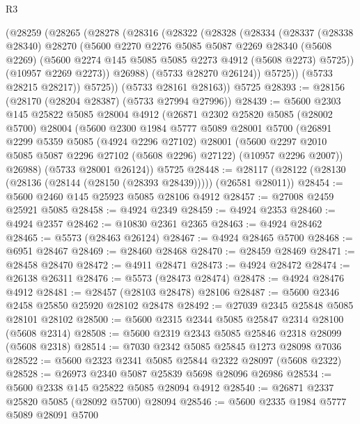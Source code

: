 \begin{lexlean}{R3}
\begin{coremodule}
      (@28259
        (@28265
          (@28278
            (@28316
              (@28322
                (@28328
                  (@28334
                    (@28337
                      (@28338 @28340)
                      @28270
                      (@5600
                        @2270
                        @2276
                        @5085
                        @5087
                        @2269
                        @28340
                        (@5608 @2269)
                        (@5600 @2274 @145 @5085 @5085 @2273 @4912 (@5608 @2273) @5725))
                      (@10957 @2269 @2273))
                    @26988)
                  (@5733 @28270 @26124))
                @5725))
            (@5733 @28215 @28217))
          @5725))
      (@5733 @28161 @28163))
    @5725
@28393 := @28156 (@28170 (@28204 @28387) (@5733 @27994 @27996))
@28439 := @5600
    @2303
    @145
    @25822
    @5085
    @28004
    @4912
    (@26871
      @2302
      @25820
      @5085
      (@28002 @5700)
      @28004
      (@5600
        @2300
        @1984
        @5777
        @5089
        @28001
        @5700
        (@26891
          @2299
          @5359
          @5085
          (@4924 @2296 @27102)
          @28001
          (@5600 @2297 @2010 @5085 @5087 @2296 @27102 (@5608 @2296) @27122)
          (@10957 @2296 @2007))
        @26988)
      (@5733 @28001 @26124))
    @5725
@28448 := @28117 (@28122 (@28130 (@28136 (@28144 (@28150 (@28393 @28439))))) (@26581 @28011))
@28454 := @5600 @2460 @145 @25923 @5085 @28106 @4912
@28457 := @27008 @2459 @25921 @5085
@28458 := @4924 @2349
@28459 := @4924 @2353
@28460 := @4924 @2357
@28462 := @10830 @2361 @2365
@28463 := @4924 @28462
@28465 := @5573 (@28463 @26124)
@28467 := @4924 @28465 @5700
@28468 := @6951 @28467
@28469 := @28460 @28468
@28470 := @28459 @28469
@28471 := @28458 @28470
@28472 := @4911 @28471
@28473 := @4924 @28472
@28474 := @26138 @26311
@28476 := @5573 (@28473 @28474)
@28478 := @4924 @28476 @4912
@28481 := @28457 (@28103 @28478) @28106
@28487 := @5600 @2346 @2458 @25850 @25920 @28102 @28478
@28492 := @27039 @2345 @25848 @5085 @28101 @28102
@28500 := @5600 @2315 @2344 @5085 @25847 @2314 @28100 (@5608 @2314)
@28508 := @5600 @2319 @2343 @5085 @25846 @2318 @28099 (@5608 @2318)
@28514 := @7030 @2342 @5085 @25845 @1273 @28098 @7036
@28522 := @5600 @2323 @2341 @5085 @25844 @2322 @28097 (@5608 @2322)
@28528 := @26973 @2340 @5087 @25839 @5698 @28096 @26986
@28534 := @5600 @2338 @145 @25822 @5085 @28094 @4912
@28540 := @26871 @2337 @25820 @5085 (@28092 @5700) @28094
@28546 := @5600 @2335 @1984 @5777 @5089 @28091 @5700

\end{coremodule}
\end{lexlean}
